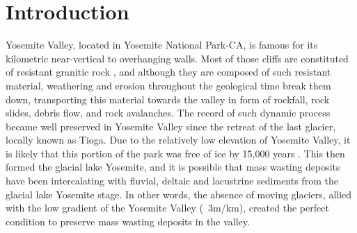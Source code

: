 \documentclass[5p]{elsarticle}
\newcommand{\alon}{\begin{color}{red}}
\newcommand{\aloff}{\end{color}}
\begin{document}

\section{Introduction}




Yosemite Valley, located in Yosemite National Park-CA, is famous for its kilometric near-vertical to overhanging walls. Most of those cliffs are constituted of resistant granitic rock \citep{bateman1992plutonism}, and although they are composed of such resistant material, weathering and erosion throughout the geological time break them down, transporting this material towards the valley in form of rockfall, rock slides, debris flow, and rock avalanches. The record of such dynamic process became well preserved in Yosemite Valley since the retreat of the last glacier, locally known as Tioga. Due to the relatively low elevation of Yosemite Valley, it is likely that this portion of the park was free of ice by 15,000 years \citep{Wieczorek+1996}. This then formed the glacial lake Yosemite, and it is possible that mass wasting deposits have been intercalating with fluvial, deltaic and lacustrine sediments from the glacial lake Yosemite stage.   In other words, the absence of moving glaciers, allied with the low gradient of the Yosemite Valley (~3m/km), created the perfect condition to preserve mass wasting deposits in the valley. 
\end{document}
